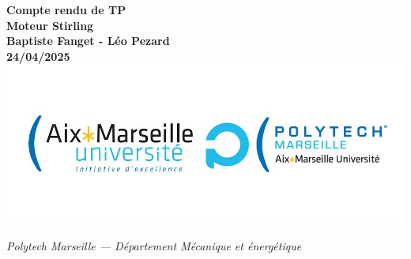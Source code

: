 \vfill

\begin{center}
{\LARGE \textbf{Compte rendu de TP \\ Moteur Stirling}} \\[1em]
\textbf{Baptiste Fanget - Léo Pezard \\
24/04/2025} \\[2em]

\includegraphics[width=1\textwidth]{logo.jpg} \\[2em]
\end{center}

\vspace*{\fill} %

\begin{center}
\textit{Polytech Marseille — Département Mécanique et énergétique}
\end{center}

\newpage
